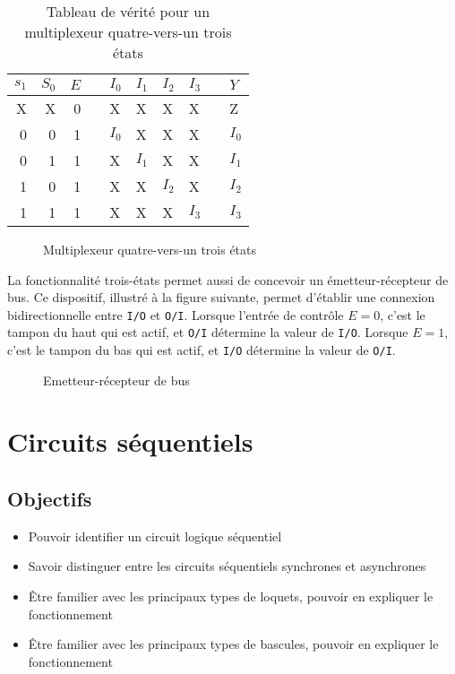 \documentclass[11pt]{article}
\begin{document}
\begin{table}[htbp]
\caption{\label{tab:orgf4967e6}Tableau de vérité pour un  multiplexeur quatre-vers-un trois états}
\centering
\begin{tabular}{rrrlllllll}
\(s_1\) & \(S_0\) & \(E\) &  & \(I_0\) & \(I_1\) & \(I_2\) & \(I_3\) &  & \(Y\)\\
\hline
X & X & 0 &  & X & X & X & X &  & Z\\
0 & 0 & 1 &  & \(I_0\) & X & X & X &  & \(I_0\)\\
0 & 1 & 1 &  & X & \(I_1\) & X & X &  & \(I_1\)\\
1 & 0 & 1 &  & X & X & \(I_2\) & X &  & \(I_2\)\\
1 & 1 & 1 &  & X & X & X & \(I_3\) &  & \(I_3\)\\
\end{tabular}
\end{table}


\begin{figure}[htbp]
\centering

\caption{\label{fig:orga6e650c}Multiplexeur quatre-vers-un trois états}
\end{figure}

La fonctionnalité trois-états permet aussi de concevoir un
émetteur-récepteur de bus. Ce dispositif, illustré à la figure
suivante, permet d'établir une connexion bidirectionnelle entre \texttt{I/O} et
\texttt{O/I}. Lorsque l'entrée de contrôle \(E = 0\), c'est le tampon du haut
qui est actif, et \texttt{O/I} détermine la valeur de \texttt{I/O}. Lorsque \(E = 1\),
c'est le tampon du bas qui est actif, et \texttt{I/O} détermine la valeur de
\texttt{O/I}.

\begin{figure}[htbp]
\centering

\caption{\label{fig:org92bde4a}Emetteur-récepteur de bus}
\end{figure}


\section{Circuits séquentiels}
\label{sec:orgbdcdf40}

\subsection{Objectifs}
\label{sec:org6363d00}
\begin{itemize}
\item Pouvoir identifier un circuit logique séquentiel
\item Savoir distinguer entre les circuits séquentiels synchrones et asynchrones
\item Être familier avec les principaux types de loquets, pouvoir en
expliquer le fonctionnement
\item Être familier avec les principaux types de bascules, pouvoir en
expliquer le fonctionnement
\end{itemize}
\end{document}
